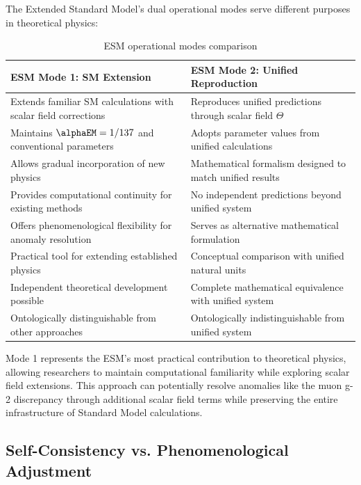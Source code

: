 	The Extended Standard Model's dual operational modes serve different purposes in theoretical physics:
	
	\begin{table}[ht]
		\centering
		\caption{ESM operational modes comparison}
		\label{tab:esm_modes_comparison}
		\begin{tabular}{p{}|p{}}
			\hline
			\textbf{ESM Mode 1: SM Extension} & \textbf{ESM Mode 2: Unified Reproduction} \\
			\hline
			Extends familiar SM calculations with scalar field corrections & Reproduces unified predictions through scalar field $\Theta$ \\
			\hline
			Maintains $\alphaEM = 1/137$ and conventional parameters & Adopts parameter values from unified calculations \\
			\hline
			Allows gradual incorporation of new physics & Mathematical formalism designed to match unified results \\
			\hline
			Provides computational continuity for existing methods & No independent predictions beyond unified system \\
			\hline
			Offers phenomenological flexibility for anomaly resolution & Serves as alternative mathematical formulation \\
			\hline
			Practical tool for extending established physics & Conceptual comparison with unified natural units \\
			\hline
			Independent theoretical development possible & Complete mathematical equivalence with unified system \\
			\hline
			Ontologically distinguishable from other approaches & Ontologically indistinguishable from unified system \cite{Duhem1906} \\
			\hline
		\end{tabular}
	\end{table}
	
	Mode 1 represents the ESM's most practical contribution to theoretical physics, allowing researchers to maintain computational familiarity while exploring scalar field extensions. This approach can potentially resolve anomalies like the muon g-2 discrepancy \cite{pascher_muon_g2_2025} through additional scalar field terms while preserving the entire infrastructure of Standard Model calculations.
	
	\subsection{Self-Consistency vs. Phenomenological Adjustment}
	\label{subsec:self_consistency_comparison}
	
